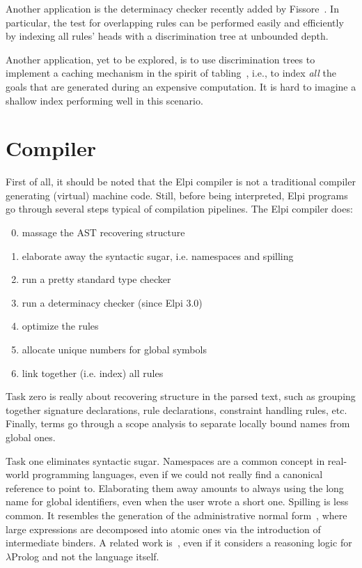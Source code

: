 \documentclass{these-ISSS}
\begin{document}
Another application is the determinacy checker recently added by
Fissore~\cite{elpidet}. In particular, the test for overlapping rules can be
performed easily and efficiently by indexing all rules' heads with a
discrimination tree at unbounded depth.


Another application, yet to be explored, is to use discrimination trees to
implement a caching mechanism in the spirit of tabling~\cite{10.1145/191839.191927,10.1007/11532231_5,selsam2020tabledtypeclassresolution}, i.e., to index
\emph{all} the goals that are generated during an expensive computation. It is
hard to imagine a shallow index performing well in this scenario.

\section{Compiler}\label{sec:compiler}


First of all, it should be noted that the Elpi compiler is not a traditional
compiler generating (virtual) machine code. Still, before being interpreted, Elpi
programs go through several steps typical of compilation pipelines. The Elpi
compiler does:

\begin{enumerate}
  \setcounter{enumi}{-1}
  \item massage the AST recovering structure
  \item elaborate away the syntactic sugar, i.e. namespaces and spilling
  \item run a pretty standard type checker
  \item run a determinacy checker (since Elpi 3.0)
  \item optimize the rules
  \item allocate unique numbers for global symbols
  \item link together (i.e. index) all rules
\end{enumerate}

\noindent
Task zero is really about recovering structure in the parsed text, such as
grouping together signature declarations, rule declarations, constraint
handling rules, etc. Finally, terms go through a scope analysis to separate
locally bound names from global ones.


Task one eliminates syntactic sugar. Namespaces are a common concept in
real-world programming languages, even if we could not really find a canonical
reference to point to. Elaborating them away amounts to always using the long
name for global identifiers, even when the user wrote a short one. Spilling is
less common. It resembles the generation of the administrative normal
form~\cite{10.1145/141478.141563}, where large expressions are decomposed
into atomic ones via the introduction of intermediate binders. A related work
is~\cite{chaudhuri:hal-01806154}, even if it considers a reasoning logic for
$\lambda$Prolog and not the language itself.
\end{document}
